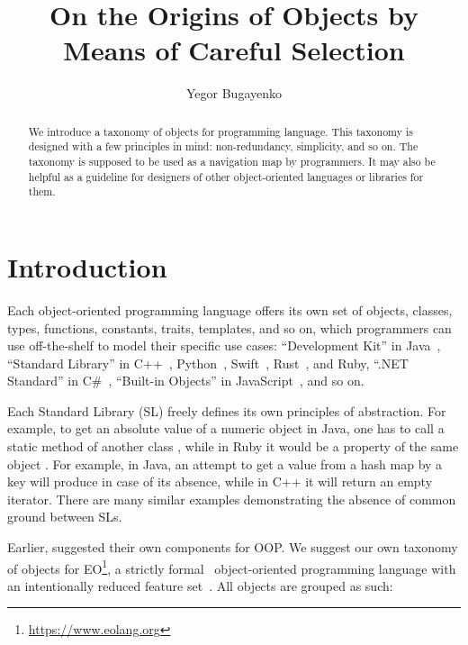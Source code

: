 \documentclass[sigplan,11pt,nonacm]{acmart}
\title{On the Origins of Objects by Means of Careful Selection}
\author{Yegor Bugayenko}
\affiliation{
  \institution{Huawei}
  \country{Russia}
  \city{Moscow}
}
\begin{document}
\raggedbottom

\begin{abstract}
We introduce a taxonomy of objects for \eolang{} programming language.
This taxonomy is designed with a few principles in mind: non-redundancy,
simplicity, and so on. The taxonomy is supposed to be used as a navigation map
by \eolang{} programmers. It may also be helpful as a guideline for designers of
other object-oriented languages or libraries for them.
\end{abstract}

\maketitle

\section{Introduction}

Each object-oriented programming language offers its own set of objects, classes, types, functions, constants, traits, templates, and so on, which programmers can use off-the-shelf to model their specific use cases:
``Development Kit'' in Java~\citep{jdk2024,java2024},
``Standard Library'' in
  C++~\citep{cpp2024,cpp2012},
  Python~\citep{python2024,python2017},
  Swift~\citep{swift2024,swift2015},
  Rust~\citep{rust2024,rust2021},
  and
  Ruby,
``.NET Standard'' in C\#~\citep{net2023,net2005},
``Built-in Objects'' in JavaScript~\citep{js2024,js2008},
and so on.

Each Standard Library (SL) freely defines its own principles of abstraction. For
example, to get an absolute value of a numeric object  in Java, one has
to call a static method of another class , while in Ruby it
would be a property of the same object . For example, in Java, an
attempt to get a value from a hash map by a key will produce  in case
of its absence, while in C++ it will return an empty iterator. There are many
similar examples demonstrating the absence of common ground between SLs.

Earlier, \citep{booch1990design} suggested their own components for OOP. We
suggest our own taxonomy of objects for
EO\footnote{\url{https://www.eolang.org}},
a strictly formal~\citep{kudasov2021} object-oriented programming language with an intentionally
reduced feature set~\citep{bugayenko2021eolang}.
All objects are grouped as such:
\end{document}
